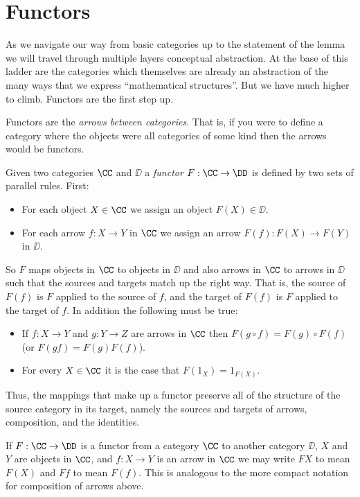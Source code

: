 \section{Functors}

As we navigate our way from basic categories up to the statement of the lemma we will
travel through multiple layers conceptual abstraction. At the base of this ladder
are the categories which themselves are already an abstraction of the many  ways
that we express ``mathematical structures''. But we have much higher to climb.
Functors are the first step up.

Functors are the {\it arrows between categories}. That is, if you were to define a
category where the objects were all categories of some kind then the arrows would be
functors.

\goodbreak
\begin{defn}
Given two categories $\CC$ and $\DD$ a {\it functor} $F : \CC \to \DD$ is defined by two
sets of parallel rules. First:
\begin{itemize}
\item For each object $X \in \CC$ we assign an object $F(X) \in \DD$.
\item For each arrow $f: X \to Y$ in $\CC$ we assign an arrow $F(f): F(X) \to F(Y)$ in
$\DD$.
\end{itemize}
\noindent
So $F$ maps objects in $\CC$ to objects in $\DD$ and also arrows in $\CC$ to arrows in
$\DD$ such that the sources and targets match up the right way. That is, the source of
$F(f)$ is $F$ applied to the source of $f$, and the target of $F(f)$ is $F$ applied to
the target of $f$. In addition the following must be true:
\begin{itemize}
\item If $f:X \to Y$ and $g: Y \to Z$ are arrows in $\CC$ then $F(g \circ f) = F(g) \circ
F(f)$ (or $F(gf) = F(g)F(f)$).
\item For every $X \in \CC$ it is the case that $F(1_X) = 1_{F(X)}$.
\end{itemize}

\end{defn}
\noindent
Thus, the mappings that make up a functor preserve all of the structure of the source category
in its target, namely the sources and targets of arrows, composition, and the identities.

If $F: \CC \to \DD$ is a functor from a category $\CC$ to another category $\DD$,
$X$ and $Y$ are objects in $\CC$, and $f: X \to Y$ is an arrow in $\CC$ we may write 
$F X$ to mean $F(X)$ and $Ff$ to mean $F(f)$.
This is analogous to the more compact notation for composition of arrows above.

